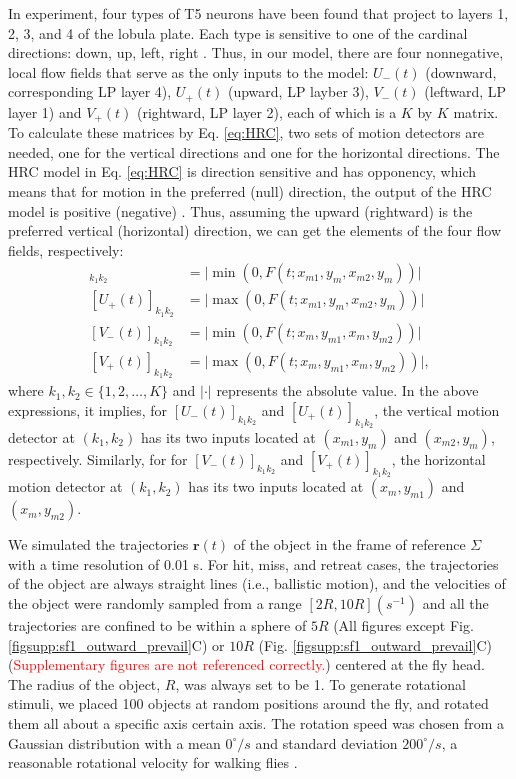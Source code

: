 \documentclass[pdftex,9pt,lineno]{elife}
\begin{document}
In experiment, four types of T5 neurons have been found that project to layers 1, 2, 3, and 4 of the lobula plate. Each type is sensitive to one of the cardinal directions: down, up, left, right \citep{maisak2013directional}. Thus, in our model, there are four nonnegative, local flow fields that serve as the only inputs to the model: $U_{-}(t)$ (downward, corresponding LP layer 4), $U_{+}(t)$ (upward, LP layber 3), $V_{-}(t)$ (leftward, LP layer 1) and $V_{+}(t)$ (rightward, LP layer 2), each of which is a $K$ by $K$ matrix. To calculate these matrices by Eq. \ref{eq:HRC}, two sets of motion detectors are needed, one for the vertical directions and one for the horizontal directions. The HRC model in Eq. \ref{eq:HRC} is direction sensitive and has opponency, which means that for motion in the preferred (null) direction, the output of the HRC model is positive (negative) \citep{adelson1985spatiotemporal}. Thus, assuming the upward (rightward) is the preferred vertical (horizontal) direction, we can get the elements of the four flow fields, respectively:
\begin{align*}
[U_{-}(t)]_{k_{1}k_{2}} &= \lvert \min(0,F(t;x_{m1},y_{m},x_{m2},y_{m})) \rvert \nonumber \\
[U_{+}(t)]_{k_{1}k_{2}} &= \lvert \max(0,F(t;x_{m1},y_{m},x_{m2},y_{m})) \rvert \nonumber \\
[V_{-}(t)]_{k_{1}k_{2}} &= \lvert \min(0,F(t;x_{m},y_{m1},x_{m},y_{m2})) \rvert  \nonumber \\
[V_{+}(t)]_{k_{1}k_{2}} &= \lvert \max(0,F(t;x_{m},y_{m1},x_{m},y_{m2})) \rvert,
\end{align*}
where $k_{1},k_{2} \in \{1,2,\dots,K\}$ and $\lvert \cdot \rvert$ represents the absolute value. In the above expressions, it implies, for $[U_{-}(t)]_{k_{1}k_{2}}$ and $[U_{+}(t)]_{k_{1}k_{2}}$, the vertical motion detector at $(k_{1},k_{2})$ has its two inputs located at $(x_{m1},y_{m})$ and $(x_{m2},y_{m})$, respectively. Similarly, for for $[V_{-}(t)]_{k_{1}k_{2}}$ and $[V_{+}(t)]_{k_{1}k_{2}}$, the horizontal motion detector at $(k_{1},k_{2})$ has its two inputs located at $(x_{m},y_{m1})$ and $(x_{m},y_{m2})$.

We simulated the trajectories $\mathbf{r}(t)$ of the object in the frame of reference $\Sigma$ with a time resolution of 0.01 s. For hit, miss, and retreat cases, the trajectories of the object are always straight lines (i.e., ballistic motion), and the velocities of the object were randomly sampled from a range $[2R,10R](s^{-1})$ and all the trajectories are confined to be within a sphere of $5R$ (All figures except Fig. \ref{figsupp:sf1_outward_prevail}C) or $10R$ (Fig. \ref{figsupp:sf1_outward_prevail}C) (\textcolor{red}{Supplementary figures are not referenced correctly.}) centered at the fly head. The radius of the object, $R$, was always set to be 1. To generate rotational stimuli, we placed 100 objects at random positions around the fly, and rotated them all about a specific axis certain axis. The rotation speed was chosen from a Gaussian distribution with a mean $0^{\circ}/s$ and standard deviation $200^{\circ}/s$, a reasonable rotational velocity for walking flies \citep{deangelis2019manifold}.
\end{document}

